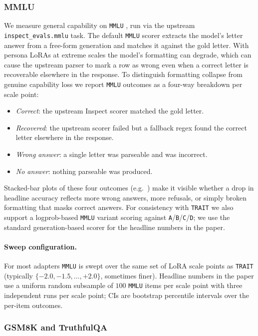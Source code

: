 \subsubsection{MMLU}\label{sec:appendix-e-mcq-mmlu}

We measure general capability on \texttt{MMLU} \citep{hendryckstest2021}, run via the upstream \texttt{inspect\_evals.mmlu} task. The default \texttt{MMLU} scorer extracts the model's letter answer from a free-form generation and matches it against the gold letter. With persona LoRAs at extreme scales the model's formatting can degrade, which can cause the upstream parser to mark a row as wrong even when a correct letter is recoverable elsewhere in the response. To distinguish formatting collapse from genuine capability loss we report \texttt{MMLU} outcomes as a four-way breakdown per scale point:
\begin{itemize}
    \item \emph{Correct}: the upstream Inspect scorer matched the gold letter.
    \item \emph{Recovered}: the upstream scorer failed but a fallback regex found the correct letter elsewhere in the response.
    \item \emph{Wrong answer}: a single letter was parseable and was incorrect.
    \item \emph{No answer}: nothing parseable was produced.
\end{itemize}
Stacked-bar plots of these four outcomes (e.g.\ ) make it visible whether a drop in headline accuracy reflects more wrong answers, more refusals, or simply broken formatting that masks correct answers. For consistency with \texttt{TRAIT} we also support a logprob-based \texttt{MMLU} variant scoring against \texttt{A}/\texttt{B}/\texttt{C}/\texttt{D}; we use the standard generation-based scorer for the headline numbers in the paper.

\paragraph{Sweep configuration.}
For most adapters \texttt{MMLU} is swept over the same set of LoRA scale points as \texttt{TRAIT} (typically $\{-2.0, -1.5, \ldots, +2.0\}$, sometimes finer). Headline numbers in the paper use a uniform random subsample of $100$ \texttt{MMLU} items per scale point with three independent runs per scale point; CIs are bootstrap percentile intervals over the per-item outcomes.

\subsubsection{GSM8K and TruthfulQA}\label{sec:appendix-e-mcq-other}

